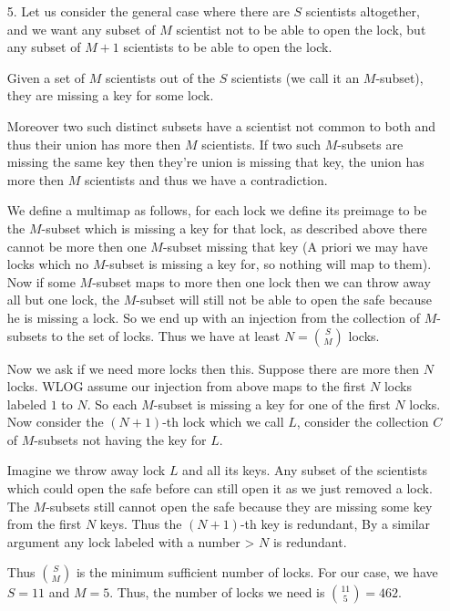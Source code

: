 \documentclass[a4paper, 12pt]{article}
\begin{document}
\begin{enumerate}
    
    \item[5.] Let us consider the general case where there are $S$ scientists altogether, and we want any subset of $M$ scientist not to be able to open the lock, but any subset of $M+1$ scientists to be able to open the lock.

Given a set of $M$ scientists out of the $S$ scientists (we call it an $M$-subset), they are missing a key for some lock.

Moreover two such distinct subsets have a scientist not common to both and thus their union has more then $M$ scientists. If two such $M$-subsets are missing the same key then they're union is missing that key, the union has more then $M$ scientists and thus we have a contradiction.

We define a multimap as follows, for each lock we define its preimage to be the $M$-subset which is missing a key for that lock, as described above there cannot be more then one $M$-subset missing that key (A priori we may have locks which no $M$-subset is missing a key for, so nothing will map to them). Now if some $M$-subset maps to more then one lock then we can throw away all but one lock, the $M$-subset will still not be able to open the safe because he is missing a lock. So we end up with an injection from the collection of $M$-subsets to the set of locks. Thus we have at least $N = {S \choose M}$ locks.

Now we ask if we need more locks then this. Suppose there are more then $N$ locks. WLOG assume our injection from above maps to the first $N$ locks labeled $1$ to $N$. So each $M$-subset is missing a key for one of the first $N$ locks. Now consider the $(N+1)$-th lock which we call $L$, consider the collection $C$ of $M$-subsets not having the key for $L$.

Imagine we throw away lock $L$ and all its keys. Any subset of the scientists which could open the safe before can still open it as we just removed a lock. The $M$-subsets still cannot open the safe because they are missing some key from the first $N$ keys. Thus the $(N+1)$-th key is redundant, By a similar argument any lock labeled with a number > $N$ is redundant.

Thus $S \choose M$ is the minimum sufficient number of locks. For our case, we have $S = 11$ and $M = 5$. Thus, the number of locks we need is ${11 \choose 5} = 462$.
    
    
    
    
    
    
\end{enumerate}
\end{document}
